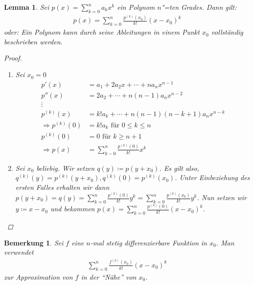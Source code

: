 \documentclass[ngerman,titlepage,twoside, parskip=half*]{scrreprt}
\theoremstyle{break}
\newtheorem{lemma}{Lemma}
\theoremstyle{nonumberbreak}
\newtheorem{remark}{Bemerkung}
\newtheorem{proof}{Beweis:}
\begin{document}
\begin{lemma}
  Sei $p(x)=\sum_{k=0}^n a_kx^k$ ein Polynom $n$"=ten Grades. Dann gilt:
  \begin{gather*}
    p(x)=\sum_{k=0}^n \frac{p^{(k)}(x_0)}{k!} (x-x_0)^k
  \end{gather*}
  oder: Ein Polynom kann durch seine Ableitungen in einem Punkt
  $x_{0}$ vollständig beschrieben werden.
  \begin{proof}
    \begin{enumerate}[1.\,F{a}ll]
    \item Sei $x_0=0$
      \begin{align*}
	p'(x)&= a_1+2a_2x+\cdots+na_nx^{n-1}\\
	p''(x)&= 2a_2+\cdots+n(n-1)a_nx^{n-2}\\
	\vdots\\
	p^{(k)}(x)&= k!a_k+\cdots+n(n-1)(n-k+1)a_nx^{n-k}\\
	\Rightarrow p^{(k)}(0)&= k!a_k\text{ für } 0\leq k\leq n\\
	p^{(k)}(0)&= 0 \text{ für } k\geq n+1\\
	\Rightarrow p(x) &=\sum_{k-0}^n \frac{p^{(k)}(0)}{k!}x^k
      \end{align*}
    \item Sei $x_0$ beliebig. Wir setzen $q(y)\coloneqq p(y+x_0)$. Es
      gilt also,  $q^{(k)} (y)=p^{(k)}(y+x_0),
      q^{(k)}(0)=p^{(k)}(x_0)$. Unter Einbeziehung des ersten Falles
      erhalten wir dann $p(y+x_0)= q(y) =\sum_{k=0}^n
      \frac{p^{(k)}(0)}{k!}y^k =\sum_{k=0}^n
      \frac{p^{(k)}(x_0)}{k!}y^k$. Nun setzen wir
      $y\coloneqq x-x_0$ und bekommen $p(x)=\sum_{k=0}^n
      \frac{p^{(k)}(0)}{k!}(x-x_0)^k$.
    \end{enumerate}
  \end{proof}
\end{lemma}

\begin{remark}
  Sei $f$ eine $n$-mal stetig differenzierbare Funktion in $x_0$. Man
  verwendet
  \begin{gather*}
    \sum_{k=0}^n \frac{f^{(k)}(x_0)}{k!}(x-x_0)^k
  \end{gather*}
  zur Approximation von $f$ in der "`Nähe"' von $x_0$.
\end{remark}
\end{document}
